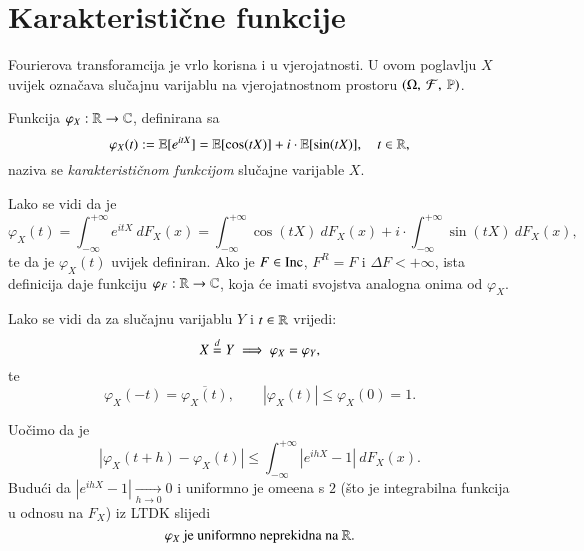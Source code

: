 
\chapter{Karakteristi\v cne funkcije}

Fourierova transforamcija je vrlo korisna i u vjerojatnosti.
U ovom poglavlju $X$ uvijek ozna\v cava slu\v cajnu varijablu na vjerojatnostnom prostoru $(\Omega, \: \mathcal{F}, \: \mathbb{P})$.

\begin{defn}    \label{def:17.1}
    Funkcija $\varphi_X :  \mathbb{R} \to \mathbb{C}$, definirana sa
    \begin{equation*}
        \varphi_X (t) := \mathbb{E} [e^{itX}] = \mathbb{E}[\cos (tX)] + i \cdot \mathbb{E} [ \sin (tX) ], \quad t \in \mathbb{R},
    \end{equation*}
    naziva se \emph{karakteristi\v cnom funkcijom} slu\v cajne varijable $X$.
\end{defn}

Lako se vidi da je
\begin{equation*}
    \varphi_X (t) = \int_{-\infty}^{+\infty} e^{itX} \: d F_X (x) = \int_{-\infty}^{+ \infty} \cos (t X)  \: d F_X (x) + i \cdot \int_{-\infty}^{+\infty} \sin (t X) \: d F_X (x),
\end{equation*}
te da je $\varphi_X (t)$ uvijek definiran.
Ako je $F \in \mathrm{Inc}$, $F^R = F$ i $\Delta F < +\infty$, ista definicija daje funkciju $\varphi_F : \mathbb{R} \to \mathbb{C}$, koja \' ce imati svojstva analogna onima od $\varphi_X$.

Lako se vidi da za slu\v cajnu varijablu $Y$ i $t \in \mathbb{R}$ vrijedi:
\begin{equation}    \label{jed:17.2}
    X \overset{d}{=} Y \implies \varphi_X = \varphi_Y,
\end{equation}
te
\begin{equation}    \label{jed:17.3}
    \varphi_X(-t) = \overline{\varphi_X (t)}, \quad \quad |\varphi_X (t)| \leq \varphi_X(0) = 1.
\end{equation}

Uo\v cimo da je
\begin{equation*}
    |\varphi_X (t+h) - \varphi_X(t)| \leq \int_{-\infty}^{+\infty} |e^{i h X} - 1| \: d F_X (x).    
\end{equation*}
Budu\' ci da $|e^{ihX} -1| \xrightarrow[h \to 0]{} 0$ i uniformno je ome\dj ena s $2$ (\v sto je integrabilna funkcija u odnosu na $F_X$) iz LTDK slijedi
\begin{equation}    \label{jed:17.4}
    \varphi_X \textnormal{ je uniformno neprekidna na } \mathbb{R}.
\end{equation}

